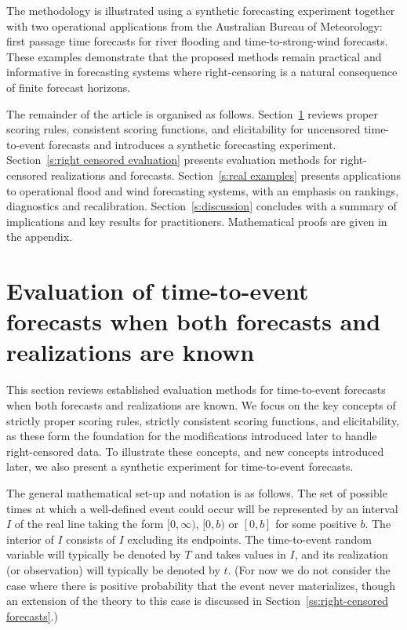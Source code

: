 \documentclass[10pt]{article} %
\theoremstyle{theorem}
\theoremstyle{definition}
\begin{document}
The methodology is illustrated using a synthetic forecasting experiment together with two operational applications from the Australian Bureau of Meteorology: first passage time forecasts for river flooding and time-to-strong-wind forecasts. These examples demonstrate that the proposed methods remain practical and informative in forecasting systems where right-censoring is a natural consequence of finite forecast horizons.

The remainder of the article is organised as follows. Section~\ref{s:evaluation when known} reviews proper scoring rules, consistent scoring functions, and elicitability for uncensored time-to-event forecasts and introduces a synthetic forecasting experiment.  Section~\ref{s:right censored evaluation} presents evaluation methods for right-censored realizations and forecasts. Section~\ref{s:real examples} presents applications to operational flood and wind forecasting systems, with an emphasis on rankings, diagnostics and recalibration. Section~\ref{s:discussion} concludes with a summary of implications and key results for practitioners. Mathematical proofs are given in the appendix.

\section{Evaluation of time-to-event forecasts when both forecasts and realizations are known}\label{s:evaluation when known}

This section reviews established evaluation methods for time-to-event forecasts when both forecasts and realizations are known. We focus on the key concepts of strictly proper scoring rules, strictly consistent scoring functions, and elicitability, as these form the foundation for the modifications introduced later to handle right-censored data. To illustrate these concepts, and new concepts introduced later, we also present a synthetic experiment for time-to-event forecasts.

The general mathematical set-up and notation is as follows. The set of possible times at which a well-defined event could occur will be represented by an interval $I$ of the real line taking the form $[0,\infty)$, $[0,b)$ or $[0,b]$ for some positive $b$. The interior of $I$ consists of $I$ excluding its endpoints. The time-to-event random variable will typically be denoted by $T$ and takes values in $I$, and its realization (or observation) will typically be denoted by $t$. (For now we do not consider the case where there is positive probability that the event never materializes, though an extension of the theory to this case is discussed in Section~\ref{ss:right-censored forecasts}.)
\end{document}
